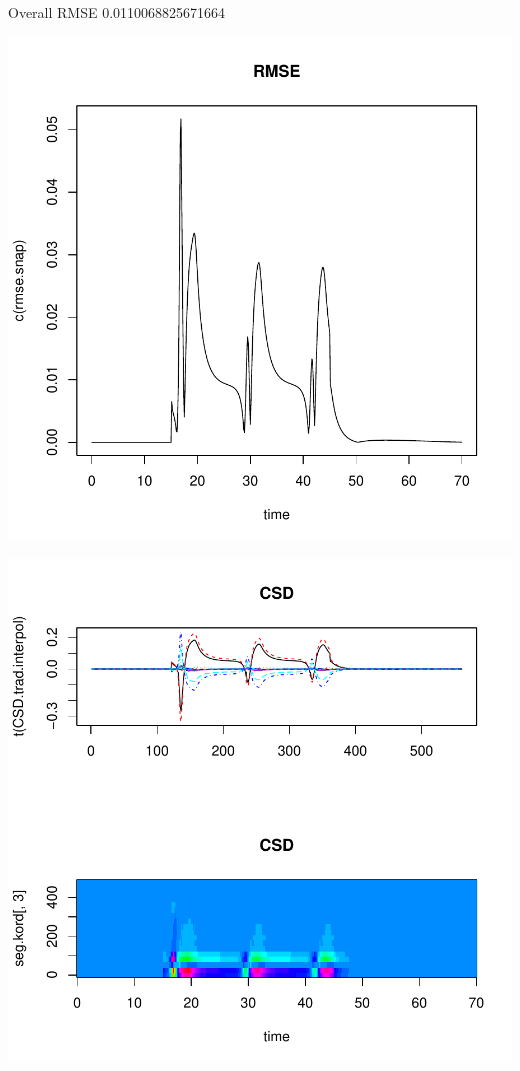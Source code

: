 \documentclass[10pt,a4paper]{report}
\begin{document}
\begin{Schunk}
\begin{Soutput}
Overall RMSE 0.0110068825671664
\end{Soutput}
\end{Schunk}
\includegraphics{bs_1D_130506-014}

\includegraphics{bs_1D_130506-CSD}
\end{document}
